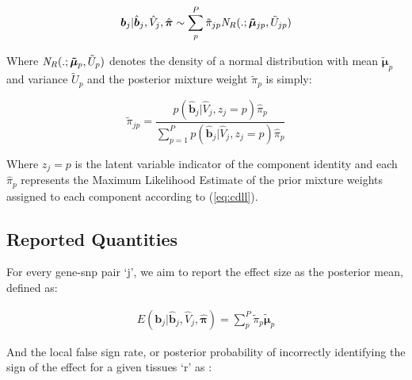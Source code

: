 \begin{enumerate}
\begin{equation}
\begin{aligned}
  \label{eq:mixpost}
\bm{b}_{j} | \hat{\bm{b}}_{j}, \hat{V}_{j}, \hat{\bm{\pi}} 
\sim \sum_{p}^{P}  \tilde \pi_{jp} {\it N}_R (.;\bm{\tilde{\mu}}_{jp},\tilde{U} _{jp} )%


\end{aligned}
\end{equation}

Where ${\it N}_R(.; \bm{\tilde{\mu}}_{p}, \tilde{U} _{p})$ denotes the density of a normal distribution with mean $\bm{\tilde{\mu}}_{p}$ and variance $\tilde{U} _{p}$ and the posterior mixture weight $\tilde \pi_{p}$ is simply:

\begin{equation}
\tilde \pi_{jp} =\frac{ p(\hat{\bm{b}}_{j}| \hat{V}_{j}, z_{j}=p) \hat \pi_{p} } {\sum_{p=1}^{P} p(\hat{\bm{b}}_{j}| \hat{V}_{j}, z_{j}=p) \hat\pi_{p}}
 \label{eqn:postpi}
\end{equation}

Where $z_{j}=p$ is the latent variable indicator of the component identity and each $\hat\pi_{p}$ represents the Maximum Likelihood Estimate of the prior mixture weights assigned to each component according to (\ref{eq:cdll}).

\subsection{Reported Quantities}

For every gene-snp pair `j', we aim to report the effect size as the posterior mean, defined as:

\begin{equation}
\begin{aligned}
E(\bm{b}_{j} | \hat{\bm{b}}_{j}, \hat{V}_{j}, \hat{\bm{\pi}})
= \sum_{p}^{P}  \tilde \pi_{p} \bm{\tilde{\mu}}_{p} %
\end{aligned}
\label{eq:mixmean}
\end{equation}


And the local false sign rate, or posterior probability of incorrectly identifying the sign of the effect for a given tissues `r' as :


\end{enumerate}

